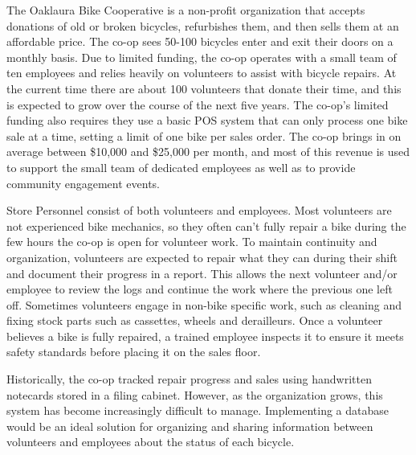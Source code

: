 \documentclass{article}
\begin{document}
\begin{tcolorbox}[colback=secondarycolor, colframe=primarycolor, arc=5mm]
\begingroup
\large
The Oaklaura Bike Cooperative is a non-profit organization that accepts donations of old or broken bicycles, refurbishes them, and then sells them at an affordable price. The co-op sees 50-100 bicycles enter and exit their doors on a monthly basis. Due to limited funding, the co-op operates with a small team of ten employees and relies heavily on volunteers to assist with bicycle repairs. At the current time there are about 100 volunteers that donate their time, and this is expected to grow over the course of the next five years. The co-op’s limited funding also requires they use a basic POS system that can only process one bike sale at a time, setting a limit of one bike per sales order. The co-op brings in on average between \$10,000 and \$25,000 per month, and most of this revenue is used to support the small team of dedicated employees as well as to provide community engagement events. 

\vspace{0.2cm}

Store Personnel consist of both volunteers and employees. Most volunteers are not experienced bike mechanics, so they often can't fully repair a bike during the few hours the co-op is open for volunteer work. To maintain continuity and organization, volunteers are expected to repair what they can during their shift and document their progress in a report. This allows the next volunteer and/or employee to review the logs and continue the work where the previous one left off. Sometimes volunteers engage in non-bike specific work, such as cleaning and fixing stock parts such as cassettes, wheels and derailleurs. Once a volunteer believes a bike is fully repaired, a trained employee inspects it to ensure it meets safety standards before placing it on the sales floor.

\vspace{0.2cm}

Historically, the co-op tracked repair progress and sales using handwritten notecards stored in a filing cabinet. However, as the organization grows, this system has become increasingly difficult to manage. Implementing a database would be an ideal solution for organizing and sharing information between volunteers and employees about the status of each bicycle.

\endgroup
\end{tcolorbox}

\vspace{0.5cm}
\end{document}
